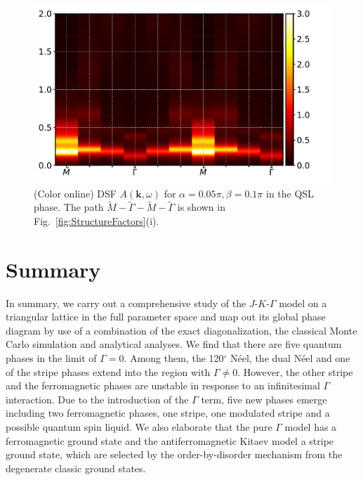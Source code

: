\documentclass[aps,prb,reprint,amsfonts,amsmath,amssymb,showpacs,groupedaddress,superscriptaddress]{revtex4-1}
\begin{document}
\begin{figure}
    \centering
    \includegraphics[width=\columnwidth]{fig/Spectrum.pdf}
    \caption{\label{fig:Spectrum}(Color online) DSF $A(\bm{k}, \omega)$ for $\alpha=0.05\pi,\beta=0.1\pi$ in the QSL phase. The path $\tilde{M}-\tilde{\Gamma}-\tilde{M}-\tilde{\Gamma}$ is shown in Fig.~\ref{fig:StructureFactors}(i).}
\end{figure}


\section{\label{sec:Summary}Summary}


In summary, we carry out a comprehensive study of the $J$-$K$-$\Gamma$ model on a triangular lattice in the full parameter space and map out its global phase diagram by use of a combination of the exact diagonalization, the classical Monte Carlo simulation and analytical analyses. We find that there are five quantum phases in the limit of $\Gamma=0$. Among them, the 120$^\circ$ N\'{e}el, the dual N\'{e}el and one of the stripe phases extend into the region with $\Gamma\ne 0$. However, the other stripe and the ferromagnetic phases are unstable in response to an infinitesimal $\Gamma$ interaction. Due to the introduction of the $\Gamma$ term, five new phases emerge including two ferromagnetic phases, one stripe, one modulated stripe and a possible quantum spin liquid. We also elaborate that the pure $\Gamma$ model has a ferromagnetic ground state and the antiferromagnetic Kitaev model a stripe ground state, which are selected by the order-by-disorder mechanism from the degenerate classic ground states.
\end{document}
